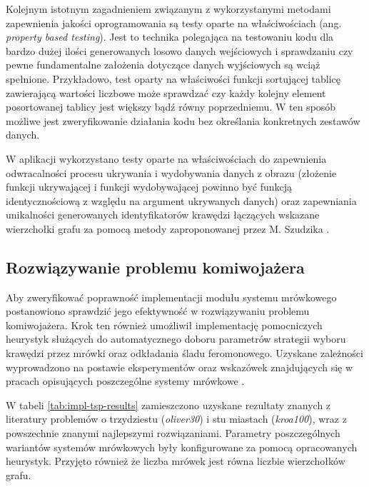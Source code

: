 {{        Kolejnym istotnym zagadnieniem związanym z wykorzystanymi metodami zapewnienia jakości oprogramowania są testy
        oparte na właściwościach (ang. \textit{property based testing}). Jest to technika polegająca na testowaniu kodu
        dla bardzo dużej ilości generowanych losowo danych wejściowych i sprawdzaniu czy pewne fundamentalne założenia
        dotyczące danych wyjściowych są wciąż spełnione. Przykładowo, test oparty na właściwości funkcji sortującej
        tablicę zawierającą wartości liczbowe może sprawdzać czy każdy kolejny element posortowanej tablicy jest większy
        bądź równy poprzedniemu. W ten sposób możliwe jest zweryfikowanie działania kodu bez określania konkretnych
        zestawów danych.

        W aplikacji wykorzystano testy oparte na właściwościach do zapewnienia odwracalności procesu ukrywania i
        wydobywania danych z obrazu (złożenie funkcji ukrywającej i funkcji wydobywającej powinno być funkcją
        identycznościową z względu na argument ukrywanych danych) oraz zapewniania unikalności generowanych
        identyfikatorów krawędzi łączących wskazane wierzchołki grafu za pomocą metody zaproponowanej przez M. Szudzika
        \cite{SzudzikFn}.

        \subsection{Rozwiązywanie problemu komiwojażera}
        {
            Aby zweryfikować poprawność implementacji modułu systemu mrówkowego postanowiono sprawdzić jego efektywność
            w rozwiązywaniu problemu komiwojażera. Krok ten również umożliwił implementację pomocniczych heurystyk
            służących do automatycznego doboru parametrów strategii wyboru krawędzi przez mrówki oraz odkładania śladu
            feromonowego. Uzyskane zależności wyprowadzono na postawie eksperymentów oraz wskazówek znajdujących się w
            pracach opisujących poszczególne systemy mrówkowe \cite{Dorigo1991AntSA, Dorigo1997AntCS,
            Sttzle2000MAXMINAS}.

            W tabeli \ref{tab:impl-tsp-results} zamieszczono uzyskane rezultaty znanych z literatury problemów o
            trzydziestu (\textit{oliver30}) i stu miastach (\textit{kroa100}), wraz z powszechnie znanymi najlepszymi
            rozwiązaniami. Parametry poszczególnych wariantów systemów mrówkowych były konfigurowane za pomocą
            opracowanych heurystyk. Przyjęto również że liczba mrówek jest równa liczbie wierzchołków grafu.

}}}
